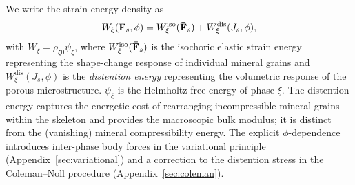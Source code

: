 \documentclass[11pt]{article}
\begin{document}
We write the strain energy density as
%
\begin{equation}
  W_\xi(\mathbf{F}_s, \phi) = W^{\text{iso}}_\xi(\mathbf{\bar F}_s) + W^{\text{dis}}_\xi(J_s, \phi),
  \label{eq:W_decomp}
\end{equation}
%
with $W_\xi = \rho_{\xi 0} \psi_\xi $, where $W^{\text{iso}}_\xi(\mathbf{\bar F}_s)$ is the isochoric elastic strain energy representing the shape-change response of individual mineral grains and $W^{\text{dis}}_\xi(J_s, \phi)$ is the \emph{distention energy} representing the volumetric response of the porous microstructure.  $\psi_\xi$ is the Helmholtz free energy of phase $\xi$. The distention energy captures the energetic cost of rearranging incompressible mineral grains within the skeleton and provides the macroscopic bulk modulus; it is distinct from the (vanishing) mineral compressibility energy.  The explicit $\phi$-dependence introduces inter-phase body forces in the variational principle (Appendix~\ref{sec:variational}) and a correction to the distention stress in the Coleman--Noll procedure (Appendix~\ref{sec:coleman}).
\end{document}

